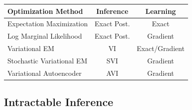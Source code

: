 \begin{frame}
\vspace{-3mm}
\begin{table}[]
    \centering
    \begin{tabular}{l c c }
    \toprule
        Optimization Method  & Inference & Learning \\
    \midrule
         Expectation Maximization & Exact Post. & Exact \\
          Log Marginal Likelihood & Exact Post. &  Gradient \\
         {\color{white} Variational EM} & {\color{white} VI} & {\color{white} Exact/Gradient} \\
         {\color{white} Stochastic Variational EM} & {\color{white} SVI} & {\color{white} Gradient}\\
         {\color{white} Variational Autoencoder} & {\color{white} AVI} & {\color{white} Gradient} \\
         \bottomrule
    \end{tabular}
\end{table}
\end{frame}

\subsection{Intractable Inference}

